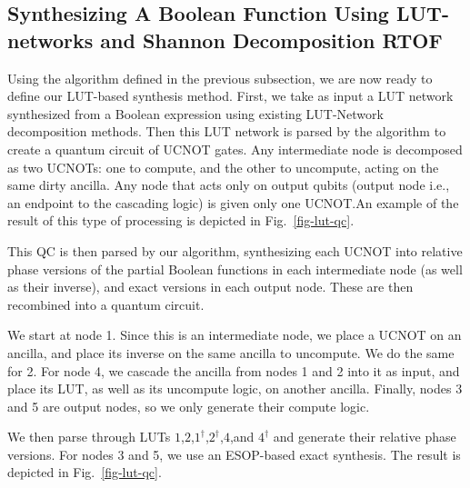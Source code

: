 \subsection{Synthesizing A Boolean Function Using LUT-networks and Shannon Decomposition RTOF}

Using the algorithm defined in the previous subsection, we are now ready to define our LUT-based synthesis method. First, we take as input a LUT network synthesized from a Boolean expression using existing LUT-Network decomposition methods. Then this LUT network is parsed by the algorithm to create a quantum circuit of UCNOT gates. Any intermediate node is decomposed as two UCNOTs: one to compute, and the other to uncompute, acting on the same dirty ancilla. Any node that acts only on output qubits (output node i.e., an endpoint to the cascading logic) is given only one UCNOT.An example of the result of this type of processing is depicted in Fig.~\ref{fig-lut-qc}.

This QC is then parsed by our algorithm, synthesizing each UCNOT into relative phase versions of the partial Boolean functions in each intermediate node (as well as their inverse), and exact versions in each output node. These are then recombined into a quantum circuit. 

\begin{example}
  \label{ex-lut}
  We start at node 1. Since this is an intermediate node, we place a UCNOT on an ancilla, and place its inverse on the same ancilla to uncompute. We do the same for 2. For node 4, we cascade the ancilla from nodes 1 and 2 into it as input, and place its LUT, as well as its uncompute logic, on another ancilla. Finally, nodes 3 and 5 are output nodes, so we only generate their compute logic.

  We then parse through LUTs $1$,$2$,$1^{\dagger}$,$2^{\dagger}$,$4$,and $4^{\dagger}$ and generate their relative phase versions. For nodes 3 and 5, we use an ESOP-based exact synthesis.
  The result is depicted in Fig.~\ref{fig-lut-qc}.
\end{example}

